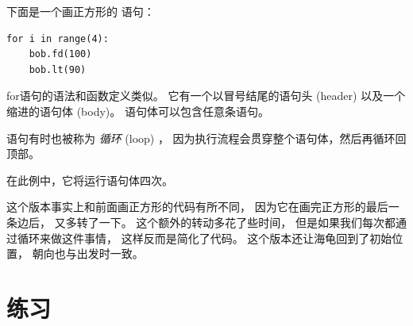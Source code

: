 
下面是一个画正方形的  语句：

\begin{lstlisting}
for i in range(4):
    bob.fd(100)
    bob.lt(90)
\end{lstlisting}


for语句的语法和函数定义类似。
它有一个以冒号结尾的语句头 (header) 以及一个缩进的语句体 (body)。
语句体可以包含任意条语句。


 语句有时也被称为 \emph{循环} (loop) ， 
因为执行流程会贯穿整个语句体，然后再循环回顶部。  

在此例中，它将运行语句体四次。



这个版本事实上和前面画正方形的代码有所不同， 因为它在画完正方形的最后一条边后， 
又多转了一下。  
这个额外的转动多花了些时间，
但是如果我们每次都通过循环来做这件事情， 这样反而是简化了代码。  
这个版本还让海龟回到了初始位置， 朝向也与出发时一致。  



\section{练习}


